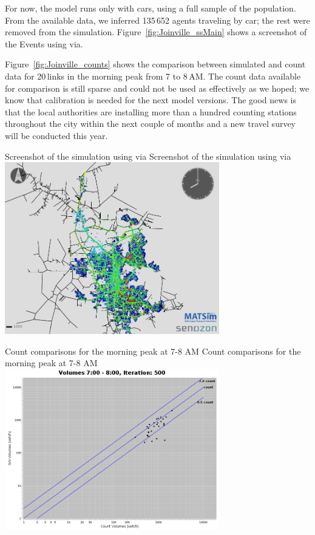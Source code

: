 For now, the model runs only with cars, using a full sample of the population. From the available data, we inferred 135\,652 agents traveling by car; the rest were removed from the simulation. Figure~\ref{fig:Joinville_ssMain} shows a screenshot of the Events using \gls{via}.

Figure~\ref{fig:Joinville_counts} shows the comparison between simulated and count data for 20\,links in the morning peak from 7 to 8\,AM. The count data available for comparison is still sparse and could not be used as effectively as we hoped; we know that calibration is needed for the next model versions. The good news is that the local authorities are installing more than a hundred counting stations throughout the city within the next couple of months and a new travel survey will be conducted this year. 

\createfigure%
{Screenshot of the simulation using \gls{via}}%
{Screenshot of the simulation using \gls{via}}%
{\label{fig:Joinville_ssMain}}%
{\includegraphics[width=0.7\textwidth, angle=0]{./scenarios/figures/Joinville_ssMain.png}}%
{}

\createfigure%
{Count comparisons for the morning peak at 7-8 AM}%
{Count comparisons for the morning peak at 7-8 AM}%
{\label{fig:Joinville_counts}}%
{\includegraphics[width=0.7\textwidth, angle=0]{./scenarios/figures/Joinville_LogManha.png}}%
{}

